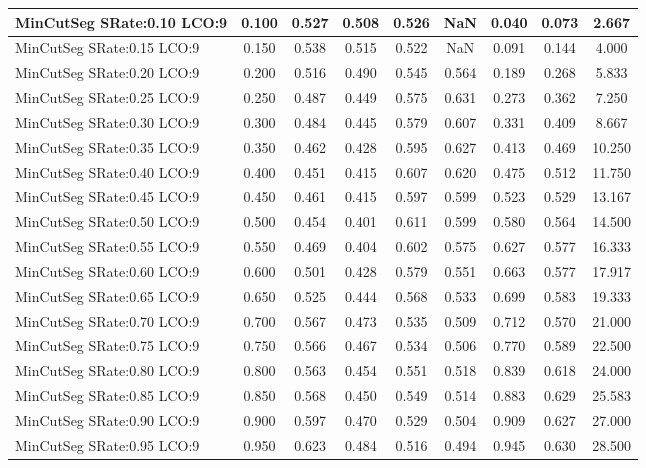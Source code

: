 \documentclass{article}
\begin{document}
\begin{longtable}[c]{|l|c|c|c|c|c|c|c|c|}
 MinCutSeg SRate:0.10 LCO:9 & 0.100 & 0.527 & 0.508 & 0.526 & NaN & 0.040 & 0.073 & 2.667  \\ \hline 
 MinCutSeg SRate:0.15 LCO:9 & 0.150 & 0.538 & 0.515 & 0.522 & NaN & 0.091 & 0.144 & 4.000  \\ \hline 
 MinCutSeg SRate:0.20 LCO:9 & 0.200 & 0.516 & 0.490 & 0.545 & 0.564 & 0.189 & 0.268 & 5.833  \\ \hline 
 MinCutSeg SRate:0.25 LCO:9 & 0.250 & 0.487 & 0.449 & 0.575 & 0.631 & 0.273 & 0.362 & 7.250  \\ \hline 
 MinCutSeg SRate:0.30 LCO:9 & 0.300 & 0.484 & 0.445 & 0.579 & 0.607 & 0.331 & 0.409 & 8.667  \\ \hline 
 MinCutSeg SRate:0.35 LCO:9 & 0.350 & 0.462 & 0.428 & 0.595 & 0.627 & 0.413 & 0.469 & 10.250  \\ \hline 
 MinCutSeg SRate:0.40 LCO:9 & 0.400 & 0.451 & 0.415 & 0.607 & 0.620 & 0.475 & 0.512 & 11.750  \\ \hline 
 MinCutSeg SRate:0.45 LCO:9 & 0.450 & 0.461 & 0.415 & 0.597 & 0.599 & 0.523 & 0.529 & 13.167  \\ \hline 
 MinCutSeg SRate:0.50 LCO:9 & 0.500 & 0.454 & 0.401 & 0.611 & 0.599 & 0.580 & 0.564 & 14.500  \\ \hline 
 MinCutSeg SRate:0.55 LCO:9 & 0.550 & 0.469 & 0.404 & 0.602 & 0.575 & 0.627 & 0.577 & 16.333  \\ \hline 
 MinCutSeg SRate:0.60 LCO:9 & 0.600 & 0.501 & 0.428 & 0.579 & 0.551 & 0.663 & 0.577 & 17.917  \\ \hline 
 MinCutSeg SRate:0.65 LCO:9 & 0.650 & 0.525 & 0.444 & 0.568 & 0.533 & 0.699 & 0.583 & 19.333  \\ \hline 
 MinCutSeg SRate:0.70 LCO:9 & 0.700 & 0.567 & 0.473 & 0.535 & 0.509 & 0.712 & 0.570 & 21.000  \\ \hline 
 MinCutSeg SRate:0.75 LCO:9 & 0.750 & 0.566 & 0.467 & 0.534 & 0.506 & 0.770 & 0.589 & 22.500  \\ \hline 
 MinCutSeg SRate:0.80 LCO:9 & 0.800 & 0.563 & 0.454 & 0.551 & 0.518 & 0.839 & 0.618 & 24.000  \\ \hline 
 MinCutSeg SRate:0.85 LCO:9 & 0.850 & 0.568 & 0.450 & 0.549 & 0.514 & 0.883 & 0.629 & 25.583  \\ \hline 
 MinCutSeg SRate:0.90 LCO:9 & 0.900 & 0.597 & 0.470 & 0.529 & 0.504 & 0.909 & 0.627 & 27.000  \\ \hline 
 MinCutSeg SRate:0.95 LCO:9 & 0.950 & 0.623 & 0.484 & 0.516 & 0.494 & 0.945 & 0.630 & 28.500  \\ \hline 

\end{longtable}
\end{document}
